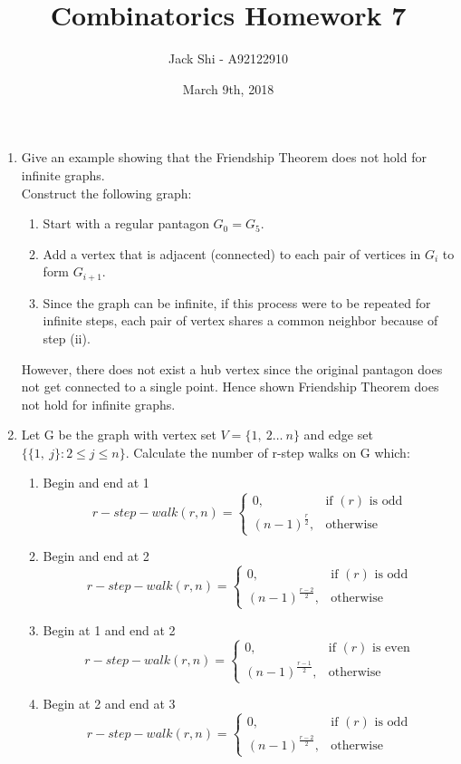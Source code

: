 \documentclass{article}
\title{Combinatorics Homework 7}
\author{Jack Shi - A92122910}
\date{March 9th, 2018}
\begin{document}
\maketitle

\begin{enumerate} [label=(\arabic*)]

	\item Give an example showing that the Friendship Theorem does not hold for
		infinite graphs.\\
		Construct the following graph:
			\begin{enumerate} [label=(\roman*)]
				\item Start with a regular pantagon $G_0=G_5$.
				\item Add a vertex that is adjacent (connected) to each pair of
					vertices in $G_i$ to form $G_{i+1}$.
				\item Since the graph can be infinite, if this process were to be
					repeated for infinite steps, each pair of vertex shares a common
					neighbor because of step (ii).
			\end{enumerate}
				However, there does not exist a hub vertex since the original pantagon
				does not get connected to a single point. Hence shown Friendship Theorem
				does not hold for infinite graphs.

	\item Let G be the graph with vertex set $V = \{1,\ 2\dots\ n\}$ and edge set
		$\{\{1,\ j\}:2\le j \le n\}$. Calculate the number of r-step walks on G
		which:
		\begin{enumerate} [label=(\alph*)]
			\item Begin and end at 1
				\[
					r-step-walk(r, n) = 
						\begin{cases}
							0, & \text{if } (r) \text{ is odd} \\
							(n-1)^{\frac{r}{2}}, & \text{otherwise}
						\end{cases}
			\]
			\item Begin and end at 2
				\[
					r-step-walk(r, n) = 
						\begin{cases}
							0, & \text{if } (r) \text{ is odd} \\
							(n-1)^{\frac{r-2}{2}}, & \text{otherwise}
						\end{cases}
			\]
			\item Begin at 1 and end at 2
				\[
					r-step-walk(r, n) = 
						\begin{cases}
							0, & \text{if } (r) \text{ is even} \\
							(n-1)^{\frac{r-1}{2}}, & \text{otherwise}
						\end{cases}
			\]
			\item Begin at 2 and end at 3
				\[
					r-step-walk(r, n) = 
						\begin{cases}
							0, & \text{if } (r) \text{ is odd} \\
							(n-1)^{\frac{r-2}{2}}, & \text{otherwise}
						\end{cases}
			\]
		\end{enumerate}


\end{enumerate}
\end{document}
